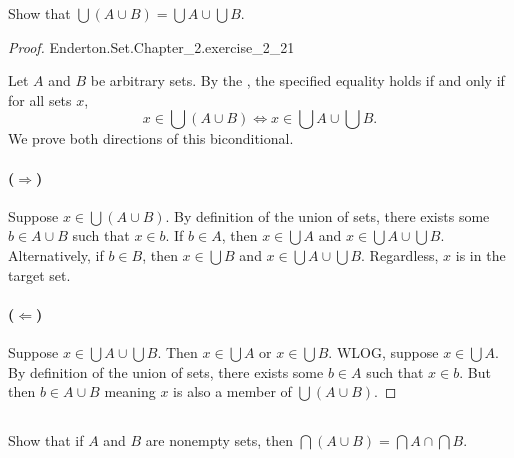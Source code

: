\documentclass{report}
\begin{document}
Show that $\bigcup (A \cup B) = \bigcup A \cup \bigcup B$.

\begin{proof}

    {Enderton.Set.Chapter\_2.exercise\_2\_21}

  Let $A$ and $B$ be arbitrary sets.
  By the , the specified equality holds if and
    only if for all sets $x$,
    $$x \in \bigcup (A \cup B) \iff x \in \bigcup A \cup \bigcup B.$$
  We prove both directions of this biconditional.

  \paragraph{($\Rightarrow$)}%

    Suppose $x \in \bigcup (A \cup B)$.
    By definition of the union of sets, there exists some $b \in A \cup B$ such
      that $x \in b$.
    If $b \in A$, then $x \in \bigcup A$ and $x \in \bigcup A \cup \bigcup B$.
    Alternatively, if $b \in B$, then $x \in \bigcup B$ and
      $x \in \bigcup A \cup \bigcup B$.
    Regardless, $x$ is in the target set.

  \paragraph{($\Leftarrow$)}%

    Suppose $x \in \bigcup A \cup \bigcup B$.
    Then $x \in \bigcup A$ or $x \in \bigcup B$.
    WLOG, suppose $x \in \bigcup A$.
    By definition of the union of sets, there exists some $b \in A$ such that
      $x \in b$.
    But then $b \in A \cup B$ meaning $x$ is also a member of
      $\bigcup (A \cup B)$.

\end{proof}

\subsection{}%

Show that if $A$ and $B$ are nonempty sets, then
  $\bigcap (A \cup B) = \bigcap A \cap \bigcap B$.
\end{document}
